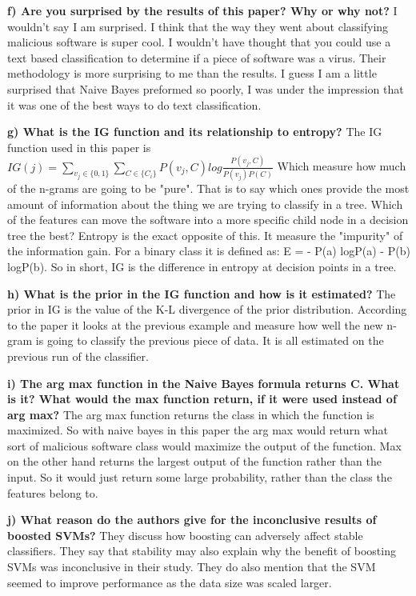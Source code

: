 \documentclass[11pt, oneside]{article}   	%
\begin{document}
	\textbf{f) Are you surprised by the results of this paper? Why or why not?}
	I wouldn't say I am surprised. I think that the way they went about classifying malicious software is super cool. I wouldn't have thought that you could use a text based classification to determine if a piece of software was a virus. Their methodology is more surprising to me than the results. I guess I am a little surprised that Naive Bayes preformed so poorly, I was under the impression that it was one of the best ways to do text classification. 
	
	\textbf{g) What is the IG function and its relationship to entropy?}
	The IG function used in this paper is $IG(j) = \sum_{v_j\in{\{0,1\}}} \sum_{C\in{\{C_i\}}}  P(v_j,C) log \frac{P(v_j,C)}{P(v_j)P(C)} $ Which measure how much of the n-grams are going to be "pure". That is to say which ones provide the most amount of information about the thing we are trying to classify in a tree. Which of the features can move the software into a more specific child node in a decision tree the best? Entropy is the exact opposite of this. It measure the "impurity" of the information gain. For a binary class it is defined as: E = - P(a) logP(a) - P(b) logP(b). So in short, IG is the difference in entropy at decision points in a tree. 
	
	\textbf{h) What is the prior in the IG function and how is it estimated?}
	The prior in IG is the value of the K-L divergence of the prior distribution. According to the paper it looks at the previous example and measure how well the new n-gram is going to classify the previous piece of data. It is all estimated on the previous run of the classifier. 
	
	\textbf{i) The arg max function in the Naive Bayes formula returns C. What is it? What would the max function return, if it 
	were used instead of arg max?}
	The arg max function returns the class in which the function is maximized. So with naive bayes in this paper the arg max would return what sort of malicious software class would maximize the output of the function. Max on the other hand returns the largest output of the function rather than the input. So it would just return some large probability, rather than the class the features belong to. 
	
	\textbf{j) What reason do the authors give for the inconclusive results of boosted SVMs?}
	They discuss how boosting can adversely affect stable classifiers. They say that stability may also explain why the benefit of boosting SVMs was inconclusive in their study. 	They do also mention that the SVM seemed to improve performance as the data size was scaled larger. 
	
\end{document}
